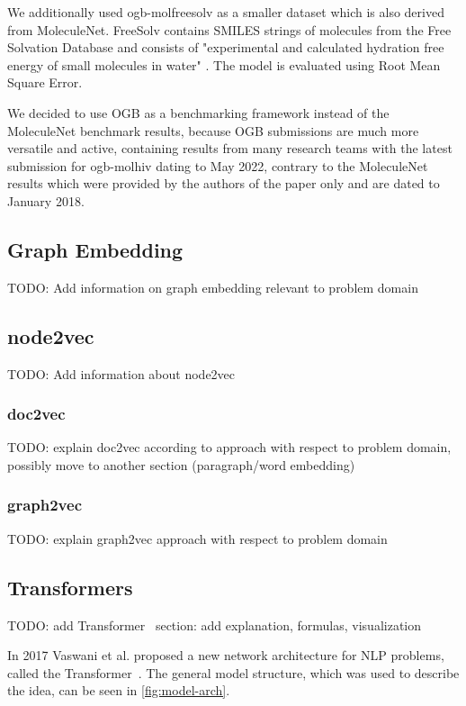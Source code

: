 We additionally used ogb-molfreesolv as a smaller dataset which is also derived from MoleculeNet. FreeSolv contains SMILES strings of molecules from the Free Solvation Database and consists of "experimental and calculated hydration free energy of small molecules in water" . The model is evaluated using Root Mean Square Error.

We decided to use OGB as a benchmarking framework instead of the MoleculeNet benchmark results, because OGB submissions are much more versatile and active, containing results from many research teams with the latest submission for ogb-molhiv dating to May 2022, contrary to the MoleculeNet results which were provided by the authors of the paper only and are dated to January 2018.


\subsection{Graph Embedding}
TODO: Add information on graph embedding relevant to problem domain

\subsection{node2vec}
TODO: Add information about node2vec
\subsubsection{doc2vec}
TODO: explain doc2vec according to \cite{2014doc2vec} approach with respect to problem domain, possibly move to another section (paragraph/word embedding)

\subsubsection{graph2vec}
TODO: explain graph2vec \cite{2017graph2vec} approach with respect to problem domain

\subsection{Transformers}
TODO: add Transformer~\cite{vaswani2017attention} section: add explanation, formulas, visualization

In 2017 Vaswani et al. proposed a new network architecture for NLP problems, called the Transformer~\cite{vaswani2017attention}. The general model structure, which was used to describe the idea, can be seen in \autoref{fig:model-arch}.

